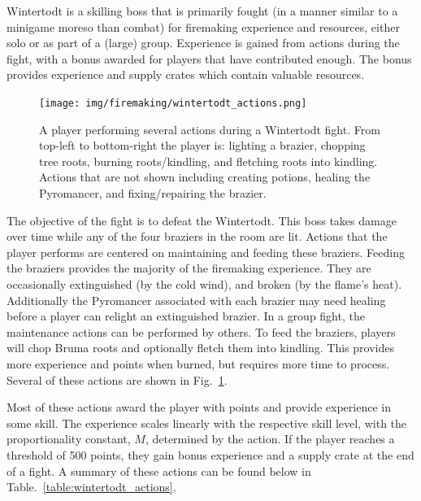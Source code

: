 Wintertodt is a skilling boss that is primarily fought (in a manner similar to a minigame moreso than combat) for firemaking experience and resources, either solo or as part of a (large) group. Experience is gained from actions during the fight, with a bonus awarded for players that have contributed enough. The bonus provides experience and supply crates which contain valuable resources.

\begin{figure}
	\centering
	\texttt{[image: img/firemaking/wintertodt\_actions.png]}
	\caption{
		A player performing several actions during a Wintertodt fight. From top-left to bottom-right the player is: lighting a brazier, chopping tree roots, burning roots/kindling, and fletching roots into kindling. Actions that are not shown including creating potions, healing the Pyromancer, and fixing/repairing the brazier.
	}
	\label{fig:wintertodt_actions}
\end{figure}

The objective of the fight is to defeat the Wintertodt. This boss takes damage over time while any of the four braziers in the room are lit. Actions that the player performs are centered on maintaining and feeding these braziers. Feeding the braziers provides the majority of the firemaking experience. They are occasionally extinguished (by the cold wind), and broken (by the flame's heat). Additionally the Pyromancer associated with each brazier may need healing before a player can relight an extinguished brazier. In a group fight, the maintenance actions can be performed by others. To feed the braziers, players will chop Bruma roots and optionally fletch them into kindling. This provides more experience and points when burned, but requires more time to process. Several of these actions are shown in Fig.~\ref{fig:wintertodt_actions}.

Most of these actions award the player with points and provide experience in some skill. The experience scales linearly with the respective skill level, with the proportionality constant, $M$, determined by the action. If the player reaches a threshold of 500 points, they gain bonus experience and a supply crate at the end of a fight. A summary of these actions can be found below in Table.~\ref{table:wintertodt_actions}.


